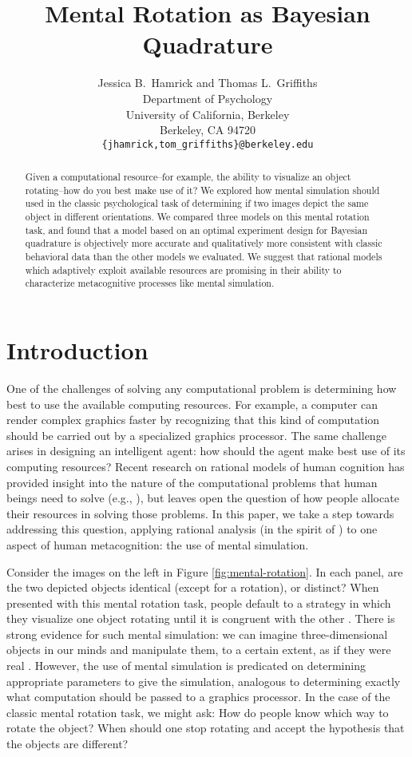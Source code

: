 \documentclass{article} %
\title{Mental Rotation as Bayesian Quadrature}
\author{Jessica B.~Hamrick and Thomas L.~Griffiths\\
  Department of Psychology\\
  University of California, Berkeley\\
  Berkeley, CA 94720\\
  \texttt{\{jhamrick,tom\_griffiths\}@berkeley.edu}}
\begin{document}
\maketitle

\begin{abstract}
  Given a computational resource--for example, the ability to
  visualize an object rotating--how do you best make use of it? We
  explored how mental simulation should used in the classic
  psychological task of determining if two images depict the same
  object in different orientations. We compared three models on this
  mental rotation task, and found that a model based on an optimal
  experiment design for Bayesian quadrature is objectively more
  accurate and qualitatively more consistent with classic behavioral
  data than the other models we evaluated. We suggest that rational
  models which adaptively exploit available resources are promising in
  their ability to characterize metacognitive processes like mental
  simulation.
\end{abstract}

\section{Introduction}

One of the challenges of solving any computational problem is
determining how best to use the available computing resources. For
example, a computer can render complex graphics faster by recognizing
that this kind of computation should be carried out by a specialized
graphics processor. The same challenge arises in designing an
intelligent agent: how should the agent make best use of its computing
resources? Recent research on rational models of human cognition has
provided insight into the nature of the computational problems that
human beings need to solve (e.g., \cite{Chater:1999wp,tenenbaumkgg11}),
but leaves open the question of how people allocate their resources in
solving those problems. In this paper, we take a step towards
addressing this question, applying rational analysis (in the spirit of
\cite{Marr:1983to,anderson90,Shepard:1987tt}) to one aspect of human
metacognition: the use of mental simulation.

Consider the images on the left in Figure
\ref{fig:mental-rotation}. In each panel, are the two depicted objects
identical (except for a rotation), or distinct? When presented with
this mental rotation task, people default to a strategy in which they
visualize one object rotating until it is congruent with the other
\cite{Shepard1971}. There is strong evidence for such mental
simulation: we can imagine three-dimensional objects in our minds and
manipulate them, to a certain extent, as if they were real
\cite{Kosslyn:2009tj}.  However, the use of mental simulation is
predicated on determining appropriate parameters to give the
simulation, analogous to determining exactly what computation should
be passed to a graphics processor.  In the case of the classic mental
rotation task, we might ask: How do people know which way to rotate
the object?  When should one stop rotating and accept the hypothesis
that the objects are different?
\end{document}
